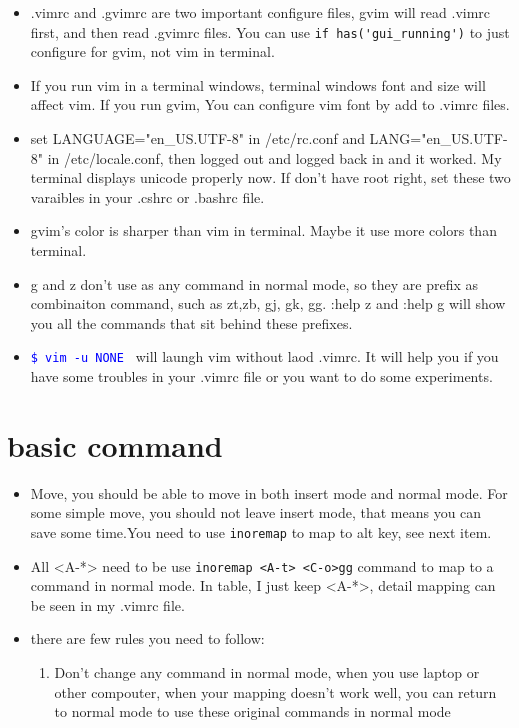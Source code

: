 \documentclass[a4paper,12pt,twoside]{book}
\newcommand{\linuxcommand}[1]{\texttt{\textcolor{blue}{\$ #1 \Pisymbol{psy}{191}}}}
\begin{document}
\begin{itemize}
\begin{itemize}
\item .vimrc and .gvimrc are two important configure files, gvim  will read .vimrc first, and then read .gvimrc files.  You can use \verb=if has('gui_running')= to just configure for gvim, not vim in terminal. 

\item If you run vim in a terminal windows, terminal windows font and size will affect vim.  If you run gvim, You can configure vim font by add to .vimrc files.  

\item set LANGUAGE="en\_US.UTF-8" in /etc/rc.conf and LANG="en\_US.UTF-8" in /etc/locale.conf, then logged out and logged back in and it worked. My terminal displays unicode properly now. If don't have root right, set these two varaibles in your .cshrc or .bashrc file.

\item gvim's color is sharper than vim in terminal.  Maybe it use more colors than terminal.  

\item g and z don't use as any command in normal mode, so they are prefix as combinaiton command, such as zt,zb, gj, gk, gg. :help z and :help g will show you all the commands that sit behind these prefixes.

\item \linuxcommand{vim -u NONE} will laungh vim without laod .vimrc. It will help you if you have some troubles in your .vimrc file or you want to do some experiments. 
\end{itemize}

\section{basic command}
	\begin{itemize}
	\item Move, you should be able to move in both insert mode and normal mode. For some simple move, you should not leave insert mode, that means you can save some time.You need to use \verb!inoremap! to map to alt key, see next item.

	\item All <A-*> need to be use \verb!inoremap <A-t> <C-o>gg! command to map to a command in normal mode. In table, I just keep <A-*>, detail mapping can be seen in my .vimrc file. 

	\item there are few rules you need to follow:
			\begin{enumerate}
					\item Don't change any command in normal mode, when you use laptop or other compouter, when your mapping doesn't work well, you can return to normal mode to use these original commands in normal mode


\end{enumerate}
\end{itemize}
\end{itemize}
\end{document}
